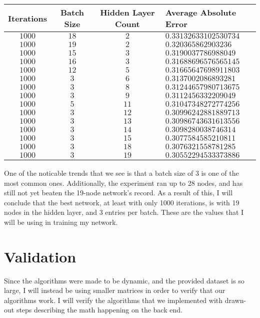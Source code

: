 \documentclass[10pt]{article}
\begin{document}
\begin{tabular}{|c|c|c|l|}
    \hline
    Iterations & Batch Size & Hidden Layer Count & Average Absolute Error\\
    \hline
    \hline
    $1000$ & $18$ & $2$ & $0.33132633102530734$\\
    $1000 $& $19$ & $2 $& $0.320365862903236$\\
    $1000$ & $15$ & $3$ &  $0.3190037786988049$\\
    $1000$ & $16$ & $3$ & $0.31688696576565145$\\
    $1000$ & $12$ & $5$ & $0.31665647698911803$\\
    $1000$ & $3$ & $6$ & $ 0.3137002086893281$\\
    $1000$ & $3$ & $8$ & $ 0.31244657980713675$\\
    $1000$ & $3$ & $9$ & $0.3112456332209049$\\
    $1000$ & $5$ & $11$ & $0.31047348272774256$\\
    $1000$ & $3$ & $12$ & $0.30996242881889713$\\
    $1000$ & $3$ & $13$ & $ 0.30986743631613556$\\
    $1000$ & $3$ & $14$ & $0.3098280038746314$\\
    $1000$ & $3$ & $15$ & $ 0.3077584585210811$\\
    $1000$ & $3$ & $18$ & $ 0.3076321558781285$\\
    $1000$ & $3$ & $19$ & $0.30552294533373886$\\
    \hline
\end{tabular}\par
One of the noticable trends that we see is that a batch size of 3 is one of the most common ones. Additionally, the experiment ran up to 28 nodes, and has still not yet beaten the 19-node network's record. As a result of this, I will conclude that the best network, at least with only 1000 iterations, is with 19 nodes in the hidden layer, and 3 entries per batch. These are the values that I will be using in training my network.
\newpage
\section{Validation}
Since the algorithms were made to be dynamic, and the provided dataset is so large, I will instead be using smaller matrices in order to verify that our algorithms work. I will verify the algorithms that we implemented with drawn-out steps describing the math happening on the back end.
\end{document}
